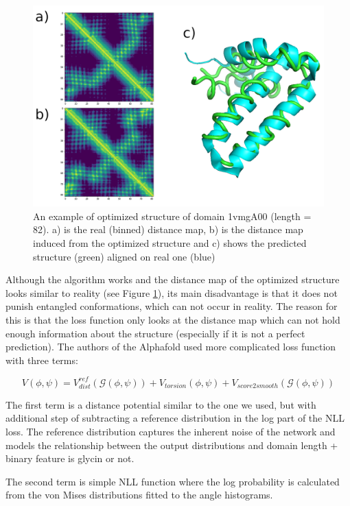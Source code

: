 \begin{figure}
    \centering
    \includegraphics[width=0.8\linewidth]{imgs_tomas/1vmg_ensemble.png}
    \caption{An example of optimized structure of domain 1vmgA00 (length = 82). a) is the real (binned) distance map, b) is the distance map induced from the optimized structure and c) shows the predicted structure (green) aligned on real one (blue)}
    \label{fig:1vmg}
\end{figure}

Although the algorithm works and the distance map of the optimized structure looks similar to reality (see Figure \ref{fig:1vmg}),
its main disadvantage is that it does not punish entangled conformations, which can not occur in reality. The reason for this is that the loss function only looks at the distance map which can not hold enough information about the structure (especially if it is not a perfect prediction). The authors of the Alphafold used more complicated loss function with three terms:

\begin{equation}
    V(\phi, \psi) = V_{dist}^{ref}(\mathcal{G}(\phi, \psi)) + V_{torsion}(\phi, \psi) + V_{score2smooth}(\mathcal{G}(\phi, \psi))
    \label{eq:alphafold_potential}
\end{equation}

The first term is a distance potential similar to the one we used, but with additional step of subtracting a reference distribution in the log part of the NLL loss. The reference distribution captures the inherent noise of the network and models the relationship between the output distributions and domain length + binary feature is glycin or not.

The second term is simple NLL function where the log probability is calculated from the von Mises distributions fitted to the angle histograms.


